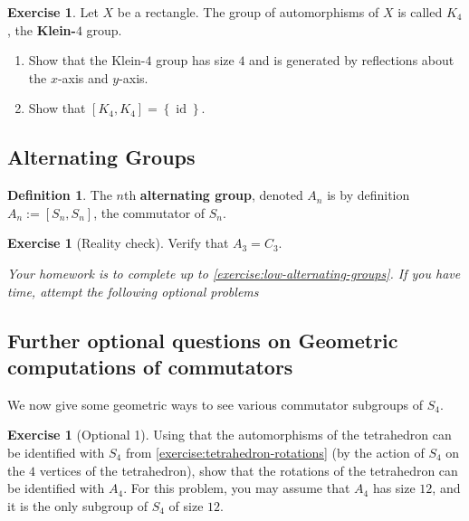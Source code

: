 \documentclass[reqno, 12pt, letter]{article}
\theoremstyle{plain}
\theoremstyle{definition}
\newtheorem{definition}[theorem]{Definition}
\newtheorem{exercise}[theorem]{Exercise}
\theoremstyle{remark}
\numberwithin{equation}{section}
\DeclareMathOperator\id{id}
\begin{document}
\begin{exercise}
	\label{exercise:klein-4}
	Let $X$ be a rectangle.
The group of automorphisms of $X$ is called $K_4$, the {\bf Klein-$4$} group.
	\begin{enumerate}
		\item Show that the Klein-$4$ group has size $4$ and is generated by reflections about the $x$-axis and $y$-axis.
		\item Show that $\left[ K_4, K_4 \right] = \left\{ \id \right\}$.
	\end{enumerate}
\end{exercise}


\subsection{Alternating Groups}

\begin{definition}
	\label{definition:alternating}
	The $n$th {\bf alternating group}, denoted $A_n$ is by definition $A_n := \left[ S_n, S_n \right]$, the commutator of $S_n$.
\end{definition}
\begin{exercise}[Reality check]
	\label{exercise:low-alternating-groups}
	Verify that $A_3 = C_3$.
\end{exercise}

{\it Your homework is to complete up to \autoref{exercise:low-alternating-groups}. If you have time, attempt the following optional
problems}

\subsection{Further optional questions on Geometric computations of commutators}
We now give some geometric ways to see various commutator subgroups of $S_4$.
\begin{exercise}[Optional 1]
	\label{exercise:}
	Using that the automorphisms of the tetrahedron can be identified with $S_4$ from \autoref{exercise:tetrahedron-rotations} (by the action of
	$S_4$ on the $4$ vertices of the tetrahedron),
	show that the rotations of the tetrahedron can be identified with $A_4$. For this problem, you may assume that $A_4$ has size $12$, and
	it is the only subgroup of $S_4$ of size $12$.
\end{exercise}
\end{document}
